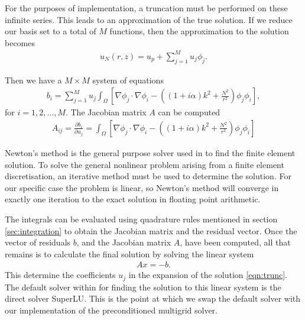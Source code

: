 For the purposes of implementation, a truncation must be performed on these infinite series.
This leads to an approximation of the true solution.
If we reduce our basis set to a total of $M$ functions, then the approximation to the solution becomes
\begin{align}
	u_N(r,z) = u_p + \sum_{j=1}^M u_j \phi_j. \label{eqn:trunc}
\end{align}

Then we have a $M\times M$ system of equations 
\begin{align}
	b_i = \sum_{j=1}^M u_j \int_\Omega \left[ \nabla \phi_j \cdot \nabla \phi_i - \left( (1+i\alpha)k^2 + \frac{N^2}{r^2}\right) \phi_j \phi_i \right],
\end{align}
for $i=1,2,\ldots,M$.
The Jacobian matrix $A$ can be computed 
\begin{align}
	A_{ij} = \frac{\partial b_i}{\partial u_j} = \int_\Omega \left[ \nabla \phi_j \cdot \nabla \phi_i - \left( (1+i\alpha)k^2 + \frac{N^2}{r^2}\right) \phi_j \phi_i \right]
\end{align}

Newton's method is the general purpose solver used in \oomph to find the finite element solution.
To solve the general nonlinear problem arising from a finite element discretisation, an iterative method must be used to determine the solution.
For our specific case the problem is linear, so Newton's method will converge in exactly one iteration to the exact solution in floating point arithmetic.

The integrals can be evaluated using quadrature rules mentioned in section \ref{sec:integration} to obtain the Jacobian matrix and the residual vector.
Once the vector of residuals $b$, and the Jacobian matrix $A$, have been computed, all that remains is to calculate the final solution by solving the linear system
\begin{align}
	A x = -b.
\end{align}
This determine the coefficients $u_j$ in the expansion of the solution \eqref{eqn:trunc}.
The default solver within \oomph for finding the solution to this linear system is the direct solver SuperLU.
This is the point at which we swap the default solver with our implementation of the preconditioned multigrid solver.
